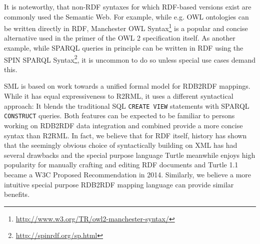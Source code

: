 It is noteworthy, that non-RDF syntaxes for which RDF-based versions exist are commonly used the Semantic Web.
For example, while e.g. OWL ontologies can be written directly in RDF, Manchester OWL Syntax\footnote{\url{http://www.w3.org/TR/owl2-manchester-syntax/}} is a popular and concise alternative used in the primer of the OWL 2 specification itself.
As another example, while SPARQL queries in principle can be written in RDF using the SPIN SPARQL Syntax\footnote{\url{http://spinrdf.org/sp.html}}, it is uncommon to do so unless special use cases demand this.

SML is based on work towards a unified formal model for RDB2RDF mappings.
While it has equal expressiveness to R2RML, it uses a different syntactical approach:
It blends the traditional SQL \texttt{CREATE VIEW} statements with SPARQL \texttt{CONSTRUCT} queries.
Both features can be expected to be familiar to persons working on RDB2RDF data integration and combined provide a more concise syntax than R2RML.
In fact, we believe that for RDF itself, history has shown that the seemingly obvious choice of syntactically building on XML has had several drawbacks and the special purpose language Turtle meanwhile enjoys high popularity for manually crafting and editing RDF documents and Turtle 1.1 became a W3C Proposed Recommendation in 2014.
Similarly, we believe a more intuitive special purpose RDB2RDF mapping language can provide similar benefits.

